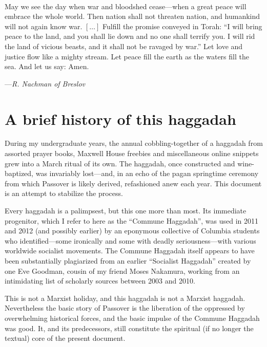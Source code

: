 \documentclass[letter,11pt,openany]{memoir}
\newcommand{\HgEllipsis}{\ensuremath{\left[\ldots\right]}}
\newcommand{\HgSource}[1]{\hfill{\small---\itshape{#1}}}
\newenvironment{HgEnglish}{\strut\\\noindent}{\vspace{1em}}
\begin{document}
\vfill

\begin{HgEnglish}
May we see the day when war and bloodshed cease---when a great peace will
embrace the whole world.  Then nation shall not threaten nation, and humankind
will not again know war. \HgEllipsis{}
Fulfill the promise conveyed in Torah: ``I will bring peace to the
land, and you shall lie down and no one shall terrify you.  I will rid the land
of vicious beasts, and it shall not be ravaged by war.'' Let love and justice
flow like a mighty stream.  Let peace fill the earth as the waters fill the sea.
And let us say: Amen. 

\HgSource{R. Nachman of Breslov}
\end{HgEnglish}

\vfill

\chapter*{A brief history of this haggadah}

During my undergraduate years, the annual cobbling-together of a haggadah from
assorted prayer books, Maxwell House freebies and miscellaneous online snippets
grew into a March ritual of its own. The haggadah, once constructed and
wine-baptized, was invariably lost---and, in an echo of the pagan springtime
ceremony from which Passover is likely derived, refashioned anew each year.  This
document is an attempt to stabilize the process.

Every haggadah is a palimpsest, but this one more than most. Its immediate
progenitor, which I refer to here as the ``Commune Haggadah'', was used in 2011
and 2012 (and possibly earlier) by an eponymous collective of Columbia students
who identified---some ironically and some with deadly seriousness---with various
worldwide socialist movements. The Commune Haggadah itself appears to have been
substantially plagiarized from an earlier ``Socialist Haggadah'' created by one
Eve Goodman, cousin of my friend Moses Nakamura, working from an intimidating
list of scholarly sources between 2003 and 2010.

This is not a Marxist holiday, and this haggadah is not a Marxist haggadah.
Nevertheless the basic story of Passover is the liberation of the oppressed by
overwhelming historical forces, and the basic impulse of the Commune Haggadah
was good. It, and its predecessors, still constitute the spiritual (if no longer
the textual) core of the present document. 
\end{document}
